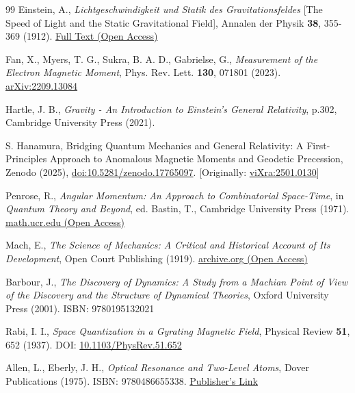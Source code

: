 \documentclass[%
 reprint,
 amsmath,amssymb,
 aps,
]{revtex4-1}
\numberwithin{equation}{section}%
\begin{document}
\begin{thebibliography}{99}
 Einstein, A.,
\textit{Lichtgeschwindigkeit und Statik des Gravitationsfeldes} [The Speed of Light and the Static Gravitational Field],
Annalen der Physik \textbf{38}, 355-369 (1912). \href{http://myweb.rz.uni-augsburg.de/~eckern/adp/history/einstein-papers/1912_38_355-369.pdf}{Full Text (Open Access)}

 Fan, X., Myers, T. G., Sukra, B. A. D., Gabrielse, G., 
\textit{Measurement of the Electron Magnetic Moment}, 
Phys. Rev. Lett. \textbf{130}, 071801 (2023). \href{https://arxiv.org/abs/2209.13084}{arXiv:2209.13084}

 Hartle, J. B., 
\textit{Gravity - An Introduction to Einstein's General Relativity}, p.302, Cambridge University Press (2021).

S. Hanamura, Bridging Quantum Mechanics and General Relativity: A First-Principles Approach to Anomalous Magnetic Moments and Geodetic Precession, Zenodo (2025), \href{https://doi.org/10.5281/zenodo.17765097}{doi:10.5281/zenodo.17765097}. [Originally: \href{https://vixra.org/abs/2501.0130}{viXra:2501.0130}]

 Penrose, R., 
\textit{Angular Momentum: An Approach to Combinatorial Space-Time}, 
in \textit{Quantum Theory and Beyond}, ed. Bastin, T., Cambridge University Press (1971).  \href{https://math.ucr.edu/home/baez/penrose/Penrose-AngularMomentum.pdf}{math.ucr.edu (Open Access)}

 Mach, E., 
\textit{The Science of Mechanics: A Critical and Historical Account of Its Development}, 
Open Court Publishing (1919). \href{https://archive.org/details/scienceofmechani00machuoft}{archive.org  (Open Access)}

 Barbour, J., 
\textit{The Discovery of Dynamics: A Study from a Machian Point of View of the Discovery and the Structure of Dynamical Theories}, 
Oxford University Press (2001). ISBN: 9780195132021

 Rabi, I. I., 
\textit{Space Quantization in a Gyrating Magnetic Field},
Physical Review \textbf{51}, 652 (1937).
DOI: \href{https://doi.org/10.1103/PhysRev.51.652}{10.1103/PhysRev.51.652}

 Allen, L., Eberly, J. H.,
\textit{Optical Resonance and Two-Level Atoms},
Dover Publications (1975).
ISBN: 9780486655338.
\href{https://store.doverpublications.com/0486655334.html}{Publisher's Link}


\end{thebibliography}
\end{document}
